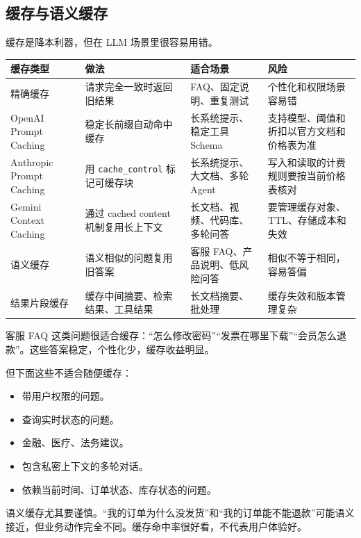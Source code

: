 \documentclass[10pt,a4paper]{ctexart}
\begin{document}
\subsection{缓存与语义缓存}


缓存是降本利器，但在 LLM 场景里很容易用错。


{\footnotesize
\begin{tabularx}{\textwidth}{|X|X|X|X|}
\hline
\textbf{缓存类型} & \textbf{做法} & \textbf{适合场景} & \textbf{风险} \\
\hline
精确缓存 & 请求完全一致时返回旧结果 & FAQ、固定说明、重复测试 & 个性化和权限场景容易错 \\
\hline
OpenAI Prompt Caching & 稳定长前缀自动命中缓存 & 长系统提示、稳定工具 Schema & 支持模型、阈值和折扣以官方文档和价格表为准 \\
\hline
Anthropic Prompt Caching & 用 \texttt{cache\_control} 标记可缓存块 & 长系统提示、大文档、多轮 Agent & 写入和读取的计费规则要按当前价格表核对 \\
\hline
Gemini Context Caching & 通过 cached content 机制复用长上下文 & 长文档、视频、代码库、多轮问答 & 要管理缓存对象、TTL、存储成本和失效 \\
\hline
语义缓存 & 语义相似的问题复用旧答案 & 客服 FAQ、产品说明、低风险问答 & 相似不等于相同，容易答偏 \\
\hline
结果片段缓存 & 缓存中间摘要、检索结果、工具结果 & 长文档摘要、批处理 & 缓存失效和版本管理复杂 \\
\hline
\end{tabularx}
}



客服 FAQ 这类问题很适合缓存：“怎么修改密码”“发票在哪里下载”“会员怎么退款”。这些答案稳定，个性化少，缓存收益明显。



但下面这些不适合随便缓存：


\begin{itemize}[itemsep=2pt, topsep=4pt]
  \item 带用户权限的问题。
  \item 查询实时状态的问题。
  \item 金融、医疗、法务建议。
  \item 包含私密上下文的多轮对话。
  \item 依赖当前时间、订单状态、库存状态的问题。
\end{itemize}


语义缓存尤其要谨慎。“我的订单为什么没发货”和“我的订单能不能退款”可能语义接近，但业务动作完全不同。缓存命中率很好看，不代表用户体验好。
\end{document}
